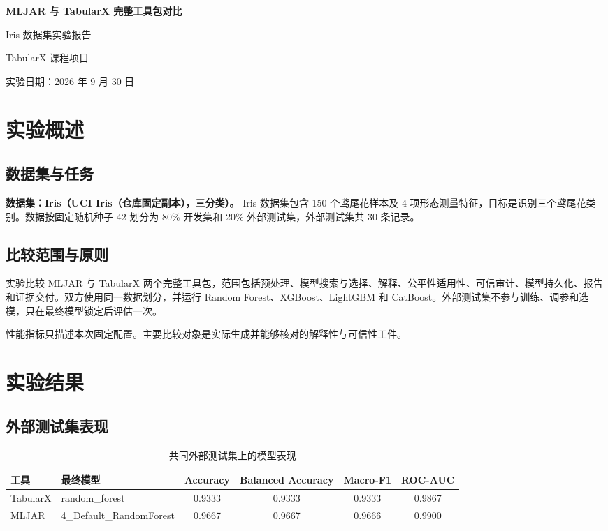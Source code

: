 \documentclass[degree=bachelor,language=chinese,fontset=fandol]{thuthesis}
\begin{document}
\begin{titlepage}
  \centering
  \vspace*{2.3cm}
  {\bfseries MLJAR 与 TabularX 完整工具包对比\par}
  \vspace{1.2cm}
  {Iris 数据集实验报告\par}
  \vspace{2.2cm}
  {TabularX 课程项目\par}
  \vfill
  {实验日期：2026 年 9 月 30 日\par}
  \vspace{1.2cm}
\end{titlepage}

\frontmatter
\tableofcontents
\mainmatter
\chapter{实验概述}
\section{数据集与任务}
\textbf{数据集：Iris（UCI Iris（仓库固定副本），三分类）。}
Iris 数据集包含 150 个鸢尾花样本及 4 项形态测量特征，目标是识别三个鸢尾花类别。数据按固定随机种子 42 划分为 80\% 开发集和 20\% 外部测试集，外部测试集共 30 条记录。

\section{比较范围与原则}
实验比较 MLJAR 与 TabularX 两个完整工具包，范围包括预处理、模型搜索与选择、解释、公平性适用性、可信审计、模型持久化、报告和证据交付。双方使用同一数据划分，并运行 Random Forest、XGBoost、LightGBM 和 CatBoost。外部测试集不参与训练、调参和选模，只在最终模型锁定后评估一次。

性能指标只描述本次固定配置。主要比较对象是实际生成并能够核对的解释性与可信性工件。

\chapter{实验结果}
\section{外部测试集表现}
\begin{table}[htbp]
  \centering
  \small
  \caption{共同外部测试集上的模型表现}
  \begin{tabular}{llcccc}
    \toprule
    工具 & 最终模型 & Accuracy & Balanced Accuracy & Macro-F1 & ROC-AUC \\
    \midrule
    TabularX & random\_forest & 0.9333 & 0.9333 & 0.9333 & 0.9867 \\
    MLJAR & 4\_Default\_RandomForest & 0.9667 & 0.9667 & 0.9666 & 0.9900 \\
    \bottomrule
  \end{tabular}
\end{table}
\end{document}

